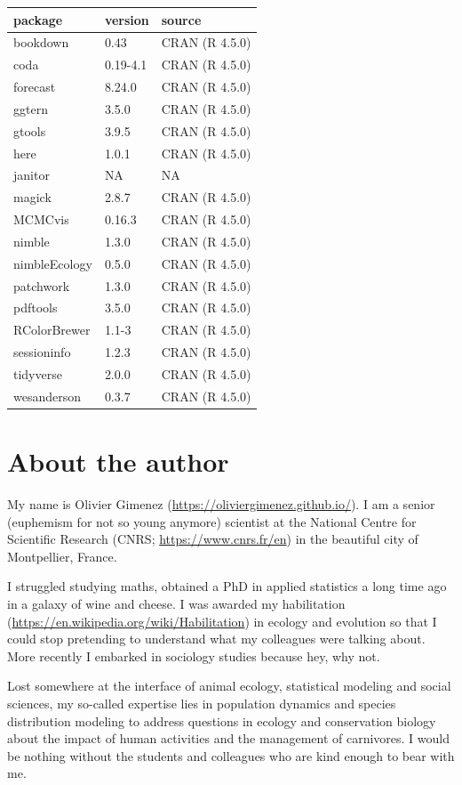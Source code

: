 \documentclass[
  12pt,
]{krantz}
\begin{document}
\begin{longtable}[]{@{}lll@{}}
\toprule\noalign{}
package & version & source \\
\midrule\noalign{}
\endhead
\bottomrule\noalign{}
\endlastfoot
bookdown & 0.43 & CRAN (R 4.5.0) \\
coda & 0.19-4.1 & CRAN (R 4.5.0) \\
forecast & 8.24.0 & CRAN (R 4.5.0) \\
ggtern & 3.5.0 & CRAN (R 4.5.0) \\
gtools & 3.9.5 & CRAN (R 4.5.0) \\
here & 1.0.1 & CRAN (R 4.5.0) \\
janitor & NA & NA \\
magick & 2.8.7 & CRAN (R 4.5.0) \\
MCMCvis & 0.16.3 & CRAN (R 4.5.0) \\
nimble & 1.3.0 & CRAN (R 4.5.0) \\
nimbleEcology & 0.5.0 & CRAN (R 4.5.0) \\
patchwork & 1.3.0 & CRAN (R 4.5.0) \\
pdftools & 3.5.0 & CRAN (R 4.5.0) \\
RColorBrewer & 1.1-3 & CRAN (R 4.5.0) \\
sessioninfo & 1.2.3 & CRAN (R 4.5.0) \\
tidyverse & 2.0.0 & CRAN (R 4.5.0) \\
wesanderson & 0.3.7 & CRAN (R 4.5.0) \\
\end{longtable}

\section*{About the author}\label{about-the-author}


My name is Olivier Gimenez (\url{https://oliviergimenez.github.io/}). I am a senior (euphemism for not so young anymore) scientist at the National Centre for Scientific Research (CNRS; \url{https://www.cnrs.fr/en}) in the beautiful city of Montpellier, France.

I struggled studying maths, obtained a PhD in applied statistics a long time ago in a galaxy of wine and cheese. I was awarded my habilitation (\url{https://en.wikipedia.org/wiki/Habilitation}) in ecology and evolution so that I could stop pretending to understand what my colleagues were talking about. More recently I embarked in sociology studies because hey, why not.

Lost somewhere at the interface of animal ecology, statistical modeling and social sciences, my so-called expertise lies in population dynamics and species distribution modeling to address questions in ecology and conservation biology about the impact of human activities and the management of carnivores. I would be nothing without the students and colleagues who are kind enough to bear with me.
\end{document}
